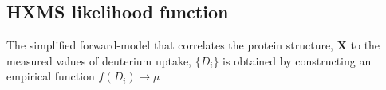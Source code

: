 \subsection{HXMS likelihood function}

The simplified forward-model that correlates the protein structure, $\mathbf{X}$ to the measured values of deuterium uptake, $\{D_i\}$ is obtained by constructing an empirical function $f(D_i) \mapsto \mu$











